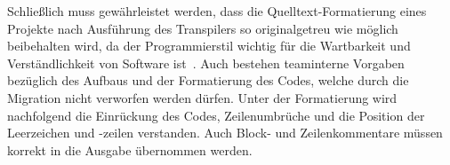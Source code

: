 Schließlich muss gewährleistet werden, dass die Quelltext-Formatierung eines Projekte nach Ausführung des Transpilers so originalgetreu wie möglich beibehalten wird, da der Programmierstil wichtig für die Wartbarkeit und Verständlichkeit von Software ist~\autocite[146]{KERNIGHAN:1982}. Auch bestehen teaminterne Vorgaben bezüglich des Aufbaus und der Formatierung des Codes, welche durch die Migration nicht verworfen werden dürfen. Unter der Formatierung wird nachfolgend die Einrückung des Codes, Zeilenumbrüche und die Position der Leerzeichen und -zeilen verstanden. Auch Block- und Zeilenkommentare müssen korrekt in die Ausgabe übernommen werden.
